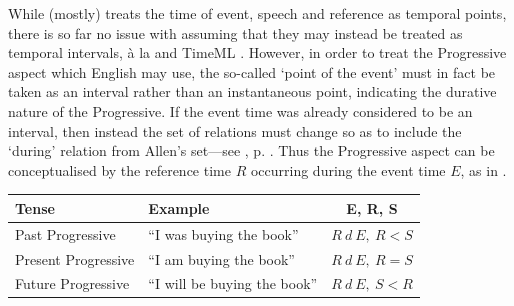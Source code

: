 \documentclass[a4paper,12pt,leqno]{article}
\begin{document}
While \citet{reichenbach1947elements} (mostly) treats the time of event, speech and reference as temporal points, there is so far no issue with assuming that they may instead be treated as temporal intervals, \`{a} la \citet{allen1983maintaining} and TimeML \citep{timeml2005timeml,sauri2006timeml}. However, in order to treat the Progressive aspect which English may use, the so-called `point of the event' must in fact be taken as an interval rather than an instantaneous point, indicating the durative nature of the Progressive. If the event time was already considered to be an interval, then instead the set of relations must change so as to include the `during' relation from Allen's set---see , p. \pageref{fig:allens-pictorial}. Thus the Progressive aspect can be conceptualised by the reference time $R$ occurring during the event time $E$, as in .
\begin{center}
	\begin{tabular}{|l l c|}
		\hline
		\textbf{Tense} & \textbf{Example} & \textbf{E, R, S}\\
		\hline
		Past Progressive & ``I was buying the book'' & $R ~d~ E,~ R < S$\\
		Present Progressive & ``I am buying the book'' & $R ~d~ E,~ R = S$\\
		Future Progressive & ``I will be buying the book'' & $R ~d~ E,~ S < R$\\
		\hline
	\end{tabular}
	\label{fig:reichenbach-progressive}
\end{center}
\end{document}
